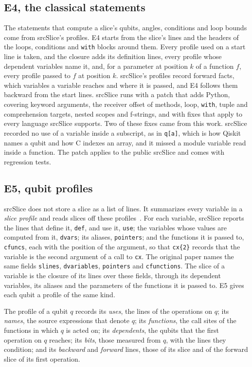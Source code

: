 \subsection{E4, the classical statements}
The statements that compute a slice's qubits, angles, conditions and loop bounds come from srcSlice's profiles. E4
starts from the slice's lines and the headers of the loops, conditions and \texttt{with} blocks around them. Every
profile used on a start line is taken, and the closure adds its definition lines, every profile whose dependent
variables name it, and, for a parameter at position $k$ of a function $f$, every profile passed to $f$ at position $k$.
srcSlice's profiles record forward facts, which variables a variable reaches and where it is passed, and E4 follows them
backward from the start lines. srcSlice runs with a patch that adds Python, covering keyword arguments, the receiver
offset of methods, loop, \texttt{with}, tuple and comprehension targets, nested scopes and f-strings, and with fixes that
apply to every language srcSlice supports. Two of these fixes came from this work. srcSlice recorded no use of a
variable inside a subscript, as in \texttt{q[a]}, which is how Qiskit names a qubit and how C indexes an array, and it
missed a module variable read inside a function. The patch applies to the public srcSlice and comes with regression
tests.

\subsection{E5, qubit profiles}
srcSlice does not store a slice as a list of lines. It summarizes every variable in a \emph{slice profile} and reads
slices off these profiles~\cite{alomari2014srcslice}. For each variable, srcSlice reports the lines that define it,
\texttt{def}, and use it, \texttt{use}; the variables whose values are computed from it, \texttt{dvars}; its aliases,
\texttt{pointers}; and the functions it is passed to, \texttt{cfuncs}, each with the position of the argument, so that
\texttt{cx\{2\}} records that the variable is the second argument of a call to \texttt{cx}. The original paper names the
same fields \texttt{slines}, \texttt{dvariables}, \texttt{pointers} and \texttt{cfunctions}. The slice of a variable is
the closure of its lines over these fields, through its dependent variables, its aliases and the parameters of the
functions it is passed to. E5 gives each qubit a profile of the same kind.

\begin{definition}\label{def:b-profile}
The profile of a qubit $q$ records its \emph{uses}, the lines of the operations on $q$; its \emph{names}, the source
expressions that denote $q$; its \emph{functions}, the call sites of the functions in which $q$ is acted on; its
\emph{dependents}, the qubits that the first operation on $q$ reaches; its \emph{bits}, those measured from $q$, with the
lines they condition; and its \emph{backward} and \emph{forward} lines, those of its slice and of the forward slice of its
first operation.
\end{definition}

